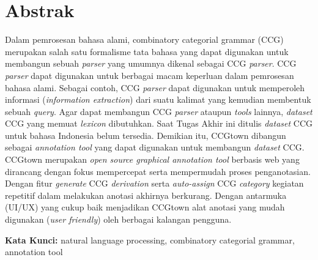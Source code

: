 \chapter*{Abstrak}

Dalam pemrosesan bahasa alami, combinatory categorial grammar (CCG) merupakan salah satu
formalisme tata bahasa yang dapat digunakan untuk membangun sebuah \textit{parser} yang umumnya
dikenal sebagai CCG \textit{parser}.
CCG \textit{parser} dapat digunakan untuk berbagai macam keperluan dalam pemrosesan bahasa alami.
Sebagai contoh, CCG \textit{parser} dapat digunakan untuk memperoleh informasi
(\textit{information extraction}) dari suatu kalimat yang kemudian membentuk sebuah \textit{query}.
Agar dapat membangun CCG \textit{parser} ataupun \textit{tools} lainnya, \textit{dataset} CCG
yang memuat \textit{lexicon} dibutuhkan. Saat Tugas Akhir ini ditulis \textit{dataset} CCG untuk
bahasa Indonesia belum tersedia. Demikian itu, CCGtown dibangun sebagai \textit{annotation tool}
yang dapat digunakan untuk membangun \textit{dataset} CCG.
CCGtown merupakan \textit{open source graphical annotation tool} berbasis web yang dirancang
dengan fokus mempercepat serta mempermudah proses penganotasian.
Dengan fitur \textit{generate} CCG \textit{derivation} serta \textit{auto-assign} CCG
\textit{category} kegiatan repetitif dalam melakukan anotasi akhirnya berkurang.
Dengan antarmuka (UI/UX) yang cukup baik menjadikan CCGtown alat anotasi yang mudah digunakan
(\textit{user friendly}) oleh berbagai kalangan pengguna.

\vspace{0.5 cm}
\begin{flushleft}
{\textbf{Kata Kunci:}
  natural language processing, combinatory categorial grammar, annotation tool
}
\end{flushleft}
